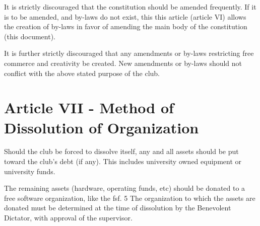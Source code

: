 \documentclass{article}
\begin{document}
	It is strictly discouraged that the constitution should be amended frequently. If it is to be amended, and by-laws do not exist, this this article (article VI) allows the creation of by-laws in favor of amending the main body of the constitution (this document).

	It is further strictly discouraged that any amendments or by-laws restricting free commerce and creativity be created. New amendments or by-laws should not conflict with the above stated purpose of the club.

	\section{Article VII - Method of Dissolution of Organization}

	Should the club be forced to dissolve itself, any and all assets should be put toward the club's debt (if any). This includes university owned equipment or university funds.

	The remaining assets (hardware, operating funds, etc) should be donated to a free software organization, like the fsf. 5 The organization to which the assets are donated must be determined at the time of dissolution by the Benevolent Dictator, with approval of the supervisor.
\end{document}
